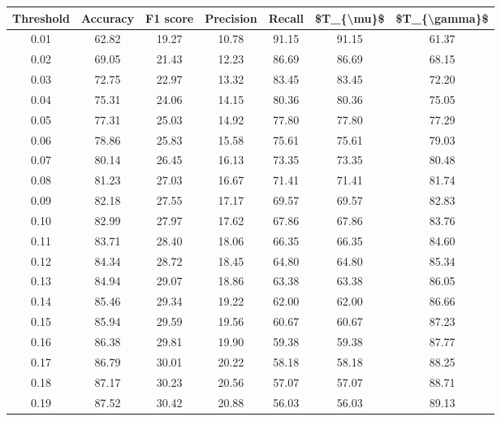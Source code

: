 \begin{tabular}{|c|c|c|c|c|c|c|}
\hline
 Threshold &  Accuracy &  F1 score &  Precision &  Recall &  \$T\_\{\textbackslash mu\}\$ &  \$T\_\{\textbackslash gamma\}\$ \\
\hline
      0.01 &     62.82 &     19.27 &      10.78 &   91.15 &      91.15 &         61.37 \\
      0.02 &     69.05 &     21.43 &      12.23 &   86.69 &      86.69 &         68.15 \\
      0.03 &     72.75 &     22.97 &      13.32 &   83.45 &      83.45 &         72.20 \\
      0.04 &     75.31 &     24.06 &      14.15 &   80.36 &      80.36 &         75.05 \\
      0.05 &     77.31 &     25.03 &      14.92 &   77.80 &      77.80 &         77.29 \\
      0.06 &     78.86 &     25.83 &      15.58 &   75.61 &      75.61 &         79.03 \\
      0.07 &     80.14 &     26.45 &      16.13 &   73.35 &      73.35 &         80.48 \\
      0.08 &     81.23 &     27.03 &      16.67 &   71.41 &      71.41 &         81.74 \\
      0.09 &     82.18 &     27.55 &      17.17 &   69.57 &      69.57 &         82.83 \\
      0.10 &     82.99 &     27.97 &      17.62 &   67.86 &      67.86 &         83.76 \\
      0.11 &     83.71 &     28.40 &      18.06 &   66.35 &      66.35 &         84.60 \\
      0.12 &     84.34 &     28.72 &      18.45 &   64.80 &      64.80 &         85.34 \\
      0.13 &     84.94 &     29.07 &      18.86 &   63.38 &      63.38 &         86.05 \\
      0.14 &     85.46 &     29.34 &      19.22 &   62.00 &      62.00 &         86.66 \\
      0.15 &     85.94 &     29.59 &      19.56 &   60.67 &      60.67 &         87.23 \\
      0.16 &     86.38 &     29.81 &      19.90 &   59.38 &      59.38 &         87.77 \\
      0.17 &     86.79 &     30.01 &      20.22 &   58.18 &      58.18 &         88.25 \\
      0.18 &     87.17 &     30.23 &      20.56 &   57.07 &      57.07 &         88.71 \\
      0.19 &     87.52 &     30.42 &      20.88 &   56.03 &      56.03 &         89.13 \\

\end{tabular}
